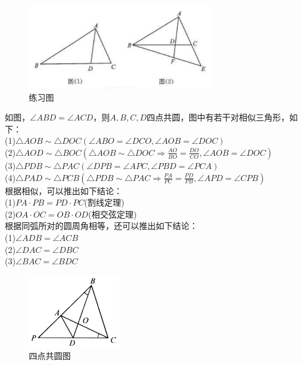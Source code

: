 \documentclass{ecnuthesis}
\begin{document}
\begin{figure}[H]
\centering
\includegraphics[width=8cm]{picture/850.png}
\caption{练习图}
\end{figure}
\begin{model}
    如图，$\angle ABD=\angle ACD$，则$A,B,C,D$四点共圆，图中有若干对相似三角形，如下：\\
    (1)$\triangle AOB \sim \triangle DOC (\angle ABO=\angle DCO, \angle AOB=\angle DOC)$ \\
    (2)$\triangle AOD \sim \triangle BOC (\triangle AOB \sim \triangle DOC \Rightarrow \frac{AO}{BO}=\frac{DO}{CO}, \angle AOB=\angle DOC)$ \\
    (3)$\triangle PDB \sim \triangle PAC (\angle DPB=\angle APC, \angle PBD=\angle PCA)$ \\
    (4)$\triangle PAD \sim \triangle PCB (\triangle PDB \sim \triangle PAC \Rightarrow \frac{PA}{PC}=\frac{PD}{PB}, \angle APD=\angle CPB)$ \\
    根据相似，可以推出如下结论： \\
    (1)$PA·PB=PD·PC$(割线定理) \\
    (2)$OA·OC=OB·OD$(相交弦定理) \\
    根据同弧所对的圆周角相等，还可以推出如下结论：\\
    (1)$\angle ADB=\angle ACB$ \\
    (2)$\angle DAC=\angle DBC$ \\
    (3)$\angle BAC=\angle BDC$ \\
\end{model}
\begin{figure}[H]
\centering
\includegraphics[width=4cm]{picture/828.png}
\caption{四点共圆图}
\end{figure}
\end{document}
